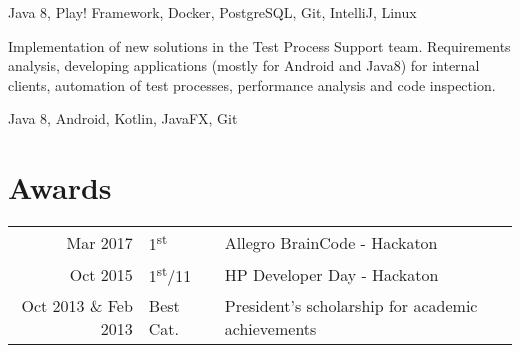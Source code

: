 \documentclass[]{deedy-resume-openfont}
\begin{document}
\begin{minipage}[t]{0.66\textwidth}
 Java 8, Play! Framework, Docker, PostgreSQL, Git, IntelliJ, Linux
\sectionsep

Implementation of new solutions in the Test Process Support team. Requirements analysis, developing applications (mostly for Android and Java8) for internal clients, automation of test processes, performance analysis and code inspection.

 Java 8, Android, Kotlin, JavaFX, Git
\sectionsep



 \section{Awards} 
 \begin{tabular}{rll}
 Mar 2017	     & 1\textsuperscript{st}     & Allegro BrainCode - Hackaton \\
 Oct 2015	     & 1\textsuperscript{st}/11  & HP Developer Day  - Hackaton\\
 Oct 2013 \& Feb 2013	     & Best Cat.  & President’s scholarship for academic achievements \\
 \end{tabular}
 \sectionsep

\end{minipage} 
\end{document}
